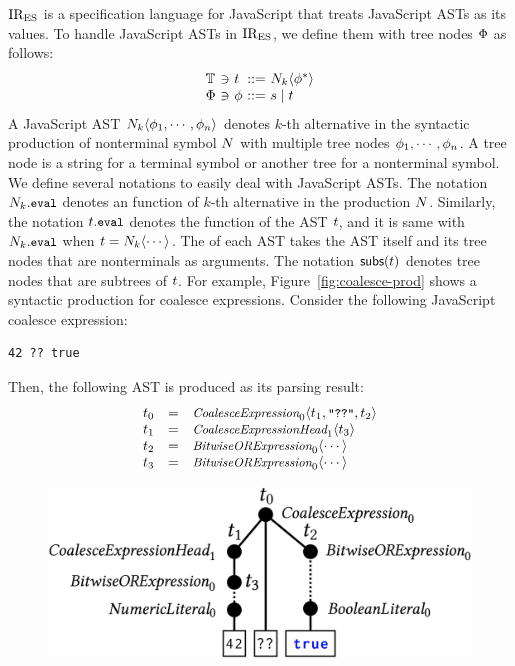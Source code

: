 $\text{IR}_\text{ES}$ is a specification language for JavaScript that treats JavaScript ASTs
as its values. To handle JavaScript ASTs in $\text{IR}_\text{ES}$, we define them with tree
nodes $\Phi$ as follows:
\[
  \begin{array}{l@{~}c@{~}l@{~}c@{~}l}
    \treeset &\ni& \tree &::=& \nt_k \langle \node^* \rangle\\
    \nodeset &\ni& \node &::=& \str \mid \tree\\
  \end{array}
\]
A JavaScript AST $N_k \langle \phi_1, \cdots, \phi_n \rangle$ denotes $k$-th
alternative in the syntactic production of nonterminal symbol $N$ with
multiple tree nodes $\phi_1, \cdots, \phi_n$.  A tree node is a string for a
terminal symbol or another tree for a nonterminal symbol. We define several
notations to easily deal with JavaScript ASTs.  The notation $N_k.{\small \texttt{eval}}$ denotes
an  function of $k$-th alternative in the production $N$.
Similarly, the notation $t.{\small \texttt{eval}}$ denotes the  function of
the AST $t$, and it is same with $N_k.{\small \texttt{eval}}$ when $t = N_k \langle
\cdots \rangle$. The  of each AST takes the AST itself and its
tree nodes that are nonterminals as arguments.  The notation $\textsf{subs}(t)$
denotes tree nodes that are subtrees of $t$.  For example,
Figure~\ref{fig:coalesce-prod} shows a syntactic production for coalesce
expressions.  Consider the following JavaScript coalesce expression:
\begin{lstlisting}[style=JS]
                    42 ?? true
\end{lstlisting}
Then, the following AST is produced as its parsing result:
\[
  \begin{array}{lcl}
    t_0 &=&
    \textit{\small CoalesceExpression}_0 \langle t_1, {\small \texttt{"??"}}, t_2 \rangle\\

    t_1 &=&
    \textit{\small CoalesceExpressionHead}_1 \langle t_3 \rangle\\

    t_2 &=&
    \textit{\small BitwiseORExpression}_0 \langle \cdots \rangle\\

    t_3 &=&
    \textit{\small BitwiseORExpression}_0 \langle \cdots \rangle\\
  \end{array}
\]
\begin{figure}[H]
  \includegraphics[width=.8\columnwidth]{img/ast-example.png}
\end{figure}
